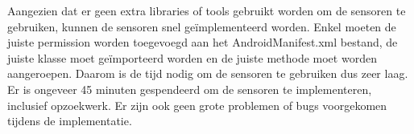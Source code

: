 Aangezien dat er geen extra libraries of tools gebruikt worden om de sensoren te gebruiken, 
kunnen de sensoren snel geïmplementeerd worden. Enkel moeten de juiste 
permission worden toegevoegd aan het AndroidManifest.xml bestand, de juiste klasse moet geïmporteerd worden en de juiste 
methode moet worden aangeroepen. Daarom is de tijd nodig om de sensoren te gebruiken dus zeer laag. 
Er is ongeveer 45 minuten gespendeerd om de sensoren te implementeren, inclusief opzoekwerk. Er zijn ook geen grote problemen of 
bugs voorgekomen tijdens de implementatie.


